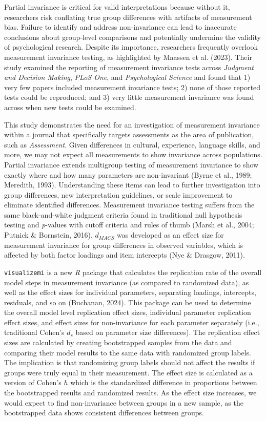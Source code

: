 \documentclass[
  english,
  man]{apa7}
\begin{document}
Partial invariance is critical for valid interpretations because without it, researchers risk conflating true group differences with artifacts of measurement bias. Failure to identify and address non-invariance can lead to inaccurate conclusions about group-level comparisons and potentially undermine the validity of psychological research. Despite its importance, researchers frequently overlook measurement invariance testing, as highlighted by Maassen et al. (2023). Their study examined the reporting of measurement invariance tests across \emph{Judgment and Decision Making}, \emph{PLoS One}, and \emph{Psychological Science} and found that 1) very few papers included measurement invariance tests; 2) none of those reported tests could be reproduced; and 3) very little measurement invariance was found across when new tests could be examined.

This study demonstrates the need for an investigation of measurement invariance within a journal that specifically targets assessments as the area of publication, such as \emph{Assessment}. Given differences in cultural, experience, language skills, and more, we may not expect all measurements to show invariance across populations. Partial invariance extends multigroup testing of measurement invariance to show exactly where and how many parameters are non-invariant (Byrne et al., 1989; Meredith, 1993). Understanding these items can lead to further investigation into group differences, new interpretation guidelines, or scale improvement to eliminate identified differences. Measurement invariance testing suffers from the same black-and-white judgment criteria found in traditional null hypothesis testing and \emph{p}-values with cutoff criteria and rules of thumb (Marsh et al., 2004; Putnick \& Bornstein, 2016). \(d_{MACS}\) was developed as an effect size for measurement invariance for group differences in observed variables, which is affected by both factor loadings and item intercepts (Nye \& Drasgow, 2011).

\texttt{visualizemi} is a new \emph{R} package that calculates the replication rate of the overall model steps in measurement invariance (as compared to randomized data), as well as the effect sizes for individual parameters, separating loadings, intercepts, residuals, and so on (Buchanan, 2024). This package can be used to determine the overall model level replication effect sizes, individual parameter replication effect sizes, and effect sizes for non-invariance for each parameter separately (i.e., traditional Cohen's \(d_s\) based on parameter size differences). The replication effect sizes are calculated by creating bootstrapped samples from the data and comparing their model results to the same data with randomized group labels. The implication is that randomizing group labels should not affect the results if groups were truly equal in their measurement. The effect size is calculated as a version of Cohen's \(h\) which is the standardized difference in proportions between the bootstrapped results and randomized results. As the effect size increases, we would expect to find non-invariance between groups in a new sample, as the bootstrapped data shows consistent differences between groups.
\end{document}
